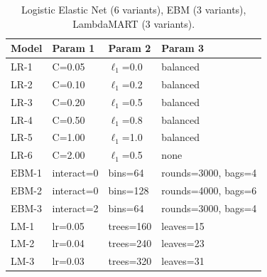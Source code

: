 \documentclass[cameraready]{Interspeech}
\begin{document}
\begin{table}[H]
\centering
\caption{Logistic Elastic Net (6 variants), EBM (3 variants), LambdaMART (3 variants).}
\label{tab:lmart_specs}
\begin{tabularx}{\columnwidth}{lXXX}
\toprule
Model & Param 1 & Param 2 & Param 3 \\
\midrule
LR-1 & C=0.05 & $\ell_1$=0.0 & balanced \\
LR-2 & C=0.10 & $\ell_1$=0.2 & balanced \\
LR-3 & C=0.20 & $\ell_1$=0.5 & balanced \\
LR-4 & C=0.50 & $\ell_1$=0.8 & balanced \\
LR-5 & C=1.00 & $\ell_1$=1.0 & balanced \\
LR-6 & C=2.00 & $\ell_1$=0.5 & none \\
\midrule
EBM-1 & interact=0 & bins=64  & rounds=3000, bags=4 \\
EBM-2 & interact=0 & bins=128 & rounds=4000, bags=6 \\
EBM-3 & interact=2 & bins=64  & rounds=3000, bags=4 \\
\midrule
LM-1 & lr=0.05 & trees=160 & leaves=15 \\
LM-2 & lr=0.04 & trees=240 & leaves=23 \\
LM-3 & lr=0.03 & trees=320 & leaves=31 \\
\bottomrule
\end{tabularx}
\end{table}
\end{document}
